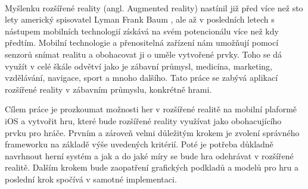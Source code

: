 \documentclass[twoside,12pt]{article}
\begin{document}
\def\,{\penalty10000\hskip.25em}
\pagestyle{headings}

\bakalarska




 
\newpage\null\thispagestyle{empty}\newpage





\obsah




%
%


﻿%
%

% 
Myšlenku rozšířené reality (angl. Augmented reality) nastínil již před více než sto lety americký spisovatel Lyman Frank Baum \cite{baum}, ale až v posledních letech s nástupem mobilních technologií získává na svém potencionálu více než kdy předtím. Mobilní technologie a přenositelná zařízení nám umožňují pomocí senzorů snímat realitu a obohacovat ji o uměle vytvořené prvky. Toho se dá využít v celé škále odvětví jako je zábavní průmysl, medicína, marketing, vzdělávání, navigace, sport a mnoho dalšího. Tato práce se zabývá aplikací rozšířené reality v zábavním průmyslu, konkrétně hrami. 

% 
Cílem práce je prozkoumat možnosti her v rozšířené realitě na mobilní plaformě iOS a vytvořit hru, které bude rozšířené reality využívat jako obohacujícího prvku pro hráče. Prvním a zároveň velmi důležitým krokem je zvolení správného frameworku na základě výše uvedených kritérií. Poté je potřeba důkladně navrhnout herní systém a jak a do jaké míry se bude hra odehrávat v rozšířené realitě. Dalším krokem bude zaopatření grafických podkladů a modelů pro hru a poslední krok spočívá v samotné implementaci.
\end{document}
